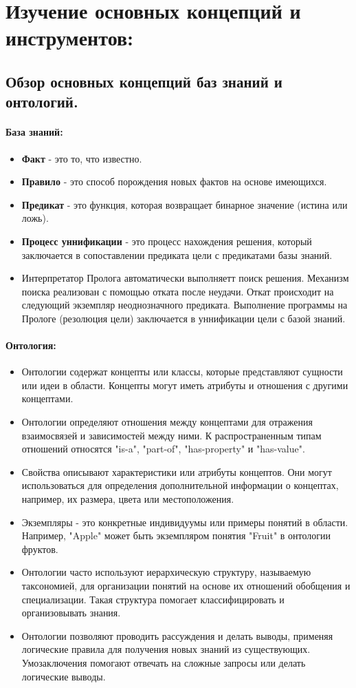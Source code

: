 \documentclass[12pt,onecolumn]{article}
\begin{document}
\section{Изучение основных концепций и инструментов:}
\subsection{Обзор основных концепций баз знаний и онтологий.}
\paragraph{База знаний:}
\begin{itemize}
  \item \textbf{Факт} - это то, что известно.
  \item \textbf{Правило} - это способ порождения новых фактов на основе имеющихся.
  \item \textbf{Предикат} - это функция, которая возвращает бинарное значение (истина или ложь).
  \item \textbf{Процесс уннификации} - это процесс нахождения решения, который заключается в сопоставлении предиката цели с предикатами базы знаний.
  \item Интерпретатор Пролога автоматически выполняетт поиск решения. 
  Механизм поиска реализован с помощью отката после неудачи. Откат происходит на следующий
  экземпляр неоднозначного предиката. Выполнение программы на Прологе (резолюция цели)
  заключается в уннификации цели с базой знаний.
\end{itemize}
\paragraph{Онтология:}
\begin{itemize}
  \item Онтологии содержат концепты или классы, которые представляют сущности или идеи в области. Концепты могут иметь атрибуты и отношения с другими концептами.
  \item Онтологии определяют отношения между концептами для отражения взаимосвязей и зависимостей между ними. К распространенным типам отношений относятся "is-a", "part-of", "has-property" и "has-value".
  \item Свойства описывают характеристики или атрибуты концептов. Они могут использоваться для определения дополнительной информации о концептах, например, их размера, цвета или местоположения.
  \item Экземпляры - это конкретные индивидуумы или примеры понятий в области. Например, "Apple" может быть экземпляром понятия "Fruit" в онтологии фруктов.
  \item Онтологии часто используют иерархическую структуру, называемую таксономией, для организации понятий на основе их отношений обобщения и специализации. Такая структура помогает классифицировать и организовывать знания.
  \item Онтологии позволяют проводить рассуждения и делать выводы, применяя логические правила для получения новых знаний из существующих. Умозаключения помогают отвечать на сложные запросы или делать логические выводы.
\end{itemize}
\end{document}
